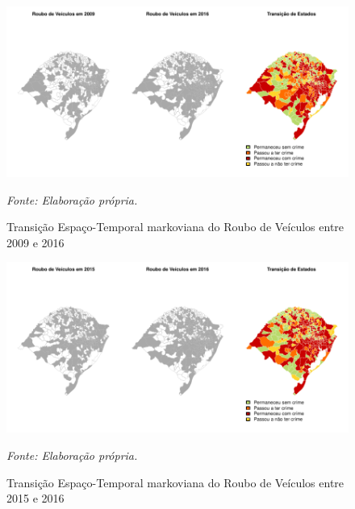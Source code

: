 \documentclass[12pt,openright,oneside,a4paper,english,french,spanish]{abntex2}
\numberwithin{table}{section} %
\numberwithin{figure}{section} %
\newcommand{\source}[1]{\textit{#1}}
\begin{document}
\begin{subappendices}
\begin{figure}[H]
\begin{center}
\includegraphics{TESE_DE_DOUTORADO_RENAN_FINAL-map_roub_vei_2009_2016}
\end{center}
\caption{Transição Espaço-Temporal markoviana do Roubo de Veículos entre 2009 e 2016}
\source{Fonte: Elaboração própria.}
\label{fig:mapas_roub_vei_markov_2009_2016}
\end{figure}

\begin{figure}[H]
\begin{center}
\includegraphics{TESE_DE_DOUTORADO_RENAN_FINAL-map_roub_vei_2015_2016}
\end{center}
\caption{Transição Espaço-Temporal markoviana do Roubo de Veículos entre 2015 e 2016}
\source{Fonte: Elaboração própria.}
\label{fig:mapas_roub_vei_markov_2015_2016}
\end{figure}


\end{subappendices}
\end{document}
